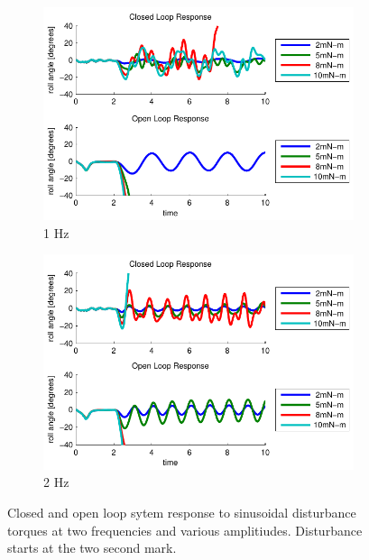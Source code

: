 \begin{figure}[t]
    \centering
    \begin{subfigure}[b]{0.48\textwidth}
        \centering
        \includegraphics[width = \textwidth]{figures/torques_small.pdf}
        \caption{1 Hz}
        \label{fig:results1Hz}
    \end{subfigure}
    \quad
    \begin{subfigure}[b]{0.48\textwidth}
        \centering
        \includegraphics[width = \textwidth]{figures/torques_small2.pdf}
        \caption{2 Hz}
        \label{fig:results2Hz}
    \end{subfigure}
    \caption{Closed and open loop sytem response to sinusoidal disturbance torques at two frequencies and various amplitiudes. Disturbance starts at the two second mark.}
\end{figure}

